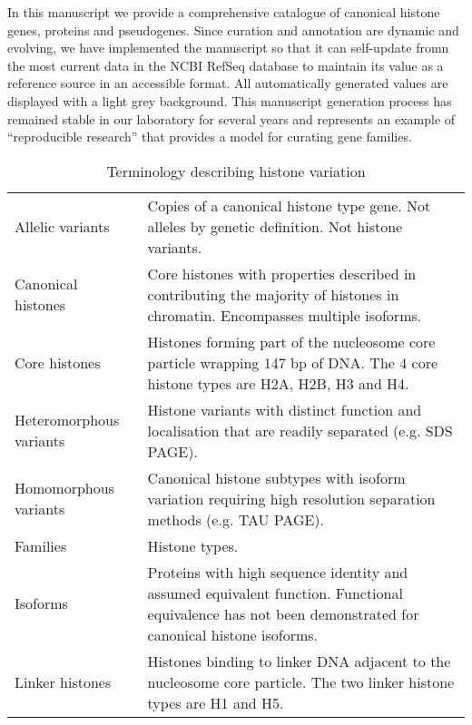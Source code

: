   In this manuscript we provide a comprehensive catalogue
  of canonical histone genes, proteins and pseudogenes.
  Since curation and annotation are dynamic and evolving,
  we have implemented the manuscript so that it can 
  self-update fromn the most current data in the NCBI RefSeq database 
  to maintain its value as a reference source in an accessible format.
  All automatically generated values are displayed with a light grey background.
  This manuscript generation process has remained stable in our laboratory for several years
  and represents an example of ``reproducible research'' \citep{Claerbout2000}
  that provides a model for curating gene families.

  \begin{table*}[htp]
    \caption{Terminology describing histone variation}
    \label{tab:histone-divisions}
    \centering
    \begin{tabular}{F p{\dimexpr(\textwidth--4\tabcolsep)}}
      \toprule
	  Allelic variants &
	  Copies of a canonical histone type gene. Not alleles by genetic definition. Not histone variants. 
	  \\
      \addlinespace
	  Canonical histones &
	  Core histones with properties described in  
	  contributing the majority of histones in chromatin.
	  Encompasses multiple isoforms.
	  \\
      \addlinespace
	  Core histones &
	  Histones forming part of the nucleosome core particle wrapping 147 bp of DNA.
	  The 4 core histone types are H2A, H2B, H3 and H4.
	  \\
      \addlinespace
	  Heteromorphous variants &
	  Histone variants with distinct function and localisation that are readily separated (e.g. SDS PAGE).
	  \\
      \addlinespace
	  Homomorphous variants &
	  Canonical histone subtypes with isoform variation 
	  requiring high resolution separation methods (e.g. TAU PAGE).
	  \\
      \addlinespace
	  Families &
	  Histone types.
	  \\
      \addlinespace
	  Isoforms &
	  Proteins with high sequence identity and assumed equivalent function. 
	  Functional equivalence has not been demonstrated for canonical histone isoforms.
	  \\
      \addlinespace
	  Linker histones &
	  Histones binding to linker DNA adjacent to the nucleosome core particle.
	  The two linker histone types are H1 and H5.
	  \\

\end{tabular}
\end{table*}

